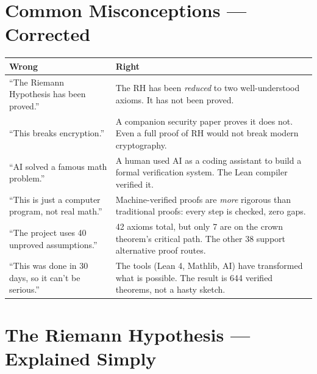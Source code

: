 \documentclass[11pt,a4paper]{article}
\begin{document}
\section{Common Misconceptions --- Corrected}

\begin{center}
\small
\begin{tabular}{@{}p{6cm}p{6.5cm}@{}}
\toprule
\textcolor{wrong}{\textbf{Wrong}} &
\textcolor{correct}{\textbf{Right}} \\
\midrule
``The Riemann Hypothesis has been proved.'' &
The RH has been \emph{reduced} to two well-understood
axioms. It has not been proved. \\[6pt]

``This breaks encryption.'' &
A companion security paper proves it does not. Even
a full proof of RH would not break modern cryptography. \\[6pt]

``AI solved a famous math problem.'' &
A human used AI as a coding assistant to build a formal
verification system. The Lean compiler verified it. \\[6pt]

``This is just a computer program, not real math.'' &
Machine-verified proofs are \emph{more} rigorous than
traditional proofs: every step is checked, zero gaps. \\[6pt]

``The project uses 40 unproved assumptions.'' &
42 axioms total, but only 7 are on the crown theorem's
critical path. The other 38 support alternative proof
routes. \\[6pt]

``This was done in 30 days, so it can't be serious.'' &
The tools (Lean 4, Mathlib, AI) have transformed what
is possible. The result is 644 verified theorems, not
a hasty sketch.  \\
\bottomrule
\end{tabular}
\end{center}

\section{The Riemann Hypothesis --- Explained Simply}
\end{document}
